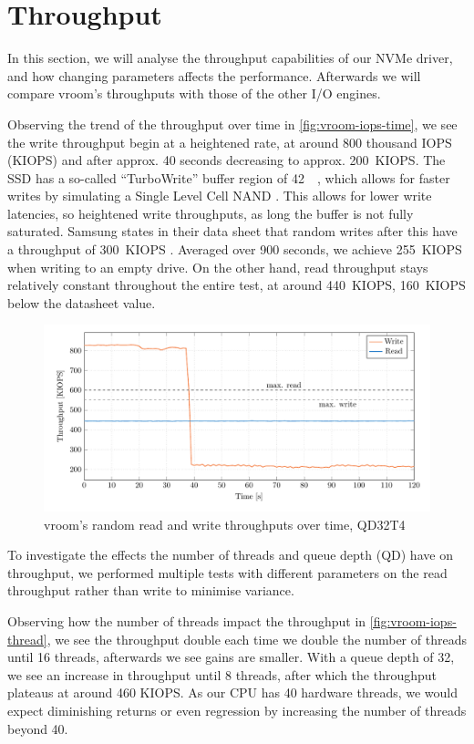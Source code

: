 \section{Throughput}
In this section, we will analyse the throughput capabilities of our NVMe driver, and how changing parameters affects the performance. Afterwards we will compare vroom's throughputs with those of the other I/O engines.

Observing the trend of the throughput over time in \autoref{fig:vroom-iops-time}, we see the write throughput begin at a heightened rate, at around 800 thousand IOPS (KIOPS) and after approx. 40 seconds decreasing to approx. \qty{200}{KIOPS}. The SSD has a so-called ``TurboWrite'' buffer region of \qty{42}{\giga\byte}, which allows for faster writes by simulating a Single Level Cell NAND \cite{turbowrite}. This allows for lower write latencies, so heightened write throughputs, as long the buffer is not fully saturated. Samsung states in their data sheet that random writes after this have a throughput of \qty{300}{KIOPS} \cite{ssd-datasheet}. Averaged over 900 seconds, we achieve \qty{255}{KIOPS} when writing to an empty drive. On the other hand, read throughput stays relatively constant throughout the entire test, at around \qty{440}{KIOPS}, \qty{160}{KIOPS} below the datasheet value.

\begin{figure}[H]
  \centering
    \includegraphics[width=\textwidth]{figures/vroom-iops-time}
    \caption{vroom's random read and write throughputs over time, QD32T4}
    \label{fig:vroom-iops-time}
\end{figure}

To investigate the effects the number of threads and queue depth (QD) have on throughput, we performed multiple tests with different parameters on the read throughput rather than write to minimise variance.

Observing how the number of threads impact the throughput in \autoref{fig:vroom-iops-thread}, we see the throughput double each time we double the number of threads until 16 threads, afterwards we see gains are smaller. With a queue depth of 32, we see an increase in throughput until 8 threads, after which the throughput plateaus at around 460 KIOPS. As our CPU has 40 hardware threads, we would expect diminishing returns or even regression by increasing the number of threads beyond 40.

